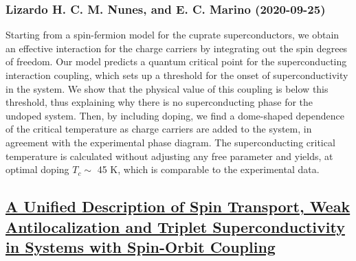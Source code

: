 \subsubsection*{Lizardo H. C. M. Nunes, and E. C. Marino (2020-09-25)}
Starting from a spin-fermion model for the cuprate superconductors, we obtain
an effective interaction for the charge carriers by integrating out the spin
degrees of freedom. Our model predicts a quantum critical point for the
superconducting interaction coupling, which sets up a threshold for the onset
of superconductivity in the system. We show that the physical value of this
coupling is below this threshold, thus explaining why there is no
superconducting phase for the undoped system. Then, by including doping, we
find a dome-shaped dependence of the critical temperature as charge carriers
are added to the system, in agreement with the experimental phase diagram. The
superconducting critical temperature is calculated without adjusting any free
parameter and yields, at optimal doping $ T_c \sim $ 45 K, which is comparable
to the experimental data.

\subsection*{\href{http://arxiv.org/abs/2009.12321v1}{A Unified Description of Spin Transport, Weak Antilocalization and  Triplet Superconductivity in Systems with Spin-Orbit Coupling}}
